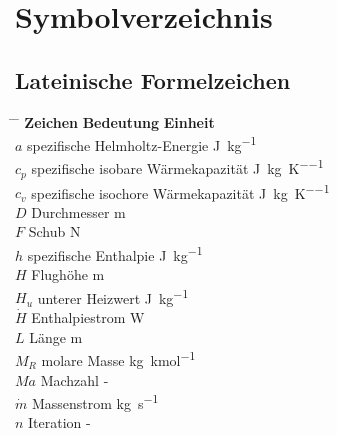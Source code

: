 \chapter*{Symbolverzeichnis}

\section*{Lateinische Formelzeichen}

\begin{tabbing}
	\hspace*{3cm} \= \hspace*{8cm} \= \hspace*{2cm}\kill
	\textbf{Zeichen} \> \textbf{Bedeutung} 				\>	\textbf{Einheit}		\\[5mm]
	$a$         \>  spezifische Helmholtz-Energie       \> \si{\J\per\kg}	 \\
    $c_p$       \>  spezifische isobare Wärmekapazität  \>  \si{\J\per\kg\per\K}	 \\
    $c_v$       \>  spezifische isochore Wärmekapazität \>  \si{\J\per\kg\per\K} \\
    $D$         \>  Durchmesser                         \>  \si{\m}  \\
    $F$         \>  Schub                               \>  \si{\N}  \\
    $h$         \>  spezifische Enthalpie               \>  \si{\J\per\kg} \\
    $H$         \>  Flughöhe                            \>  \si{\m} \\
    $H_u$       \>  unterer Heizwert                    \>  \si{\J\per\kg} \\
    $\dot{H}$   \>  Enthalpiestrom                      \>  \si{\W}   \\
    $L$         \>  Länge                               \>  \si{\m}   \\
    $M_R$       \>  molare Masse                        \>  \si{\kg\per\kmol} \\
    $Ma$        \>  Machzahl                            \>  -   \\
    $\dot{m}$   \>  Massenstrom                         \>  \si{\kg\per\s} \\
    $n$         \>  Iteration                           \>  -  \\

\end{tabbing}
